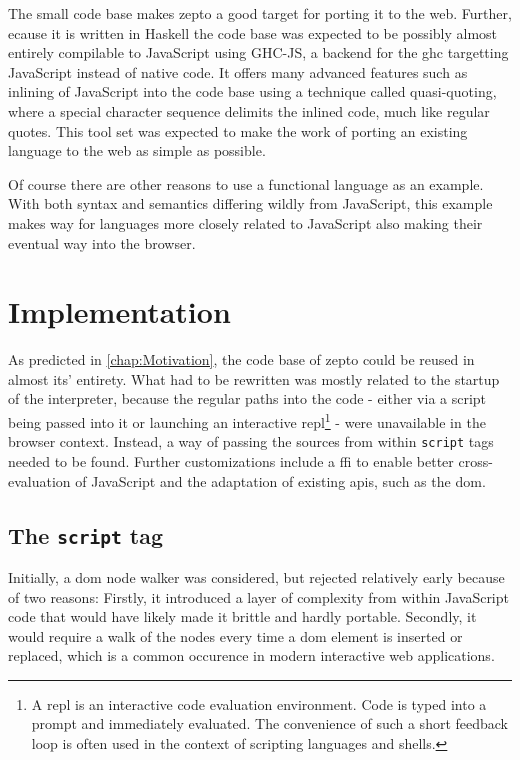 \documentclass[oneside,11pt,xetex]{scrbook}
\begin{document}
\begin{onehalfspace}
The small code base makes zepto a good target for porting it to the web. Further, ecause it
is written in Haskell the code base was expected to be possibly almost entirely compilable
to JavaScript using GHC-JS, a backend for the \gls{ghc} targetting JavaScript instead of
native code. It offers many advanced features such as inlining of JavaScript into the code
base using a technique called quasi-quoting, where a special character sequence delimits the
inlined code, much like regular quotes. This tool set was expected to make the work of porting
an existing language to the web as simple as possible.

Of course there are other reasons to use a functional language as an example. With both syntax
and semantics differing wildly from JavaScript, this example makes way for languages more
closely related to JavaScript also making their eventual way into the browser.

\chapter{Implementation}
\label{chap:Implementation}

As predicted in \ref{chap:Motivation}, the code base of zepto could be reused in almost its' entirety.
What had to be rewritten was mostly related to the startup of the interpreter, because the regular
paths into the code - either via a script being passed into it or launching an interactive
\gls{repl}\footnote{A \gls{repl} is an interactive code evaluation environment. Code is typed into
a prompt and immediately evaluated. The convenience of such a short feedback loop is often used
in the context of scripting languages and shells.} - were unavailable in the browser context.
Instead, a way of passing the sources from within \texttt{script} tags needed to be found. Further
customizations include a \gls{ffi} to enable better cross-evaluation of JavaScript and the adaptation
of existing \gls{apis}, such as the \gls{dom}.

\section{The \texttt{script} tag}

Initially, a \gls{dom} node walker was considered, but rejected relatively early because of two reasons:
Firstly, it introduced a layer of complexity from within JavaScript code that would have likely made
it brittle and hardly portable. Secondly, it would require a walk of the nodes every time a \gls{dom}
element is inserted or replaced, which is a common occurence in modern interactive web applications.


\end{onehalfspace}
\end{document}
